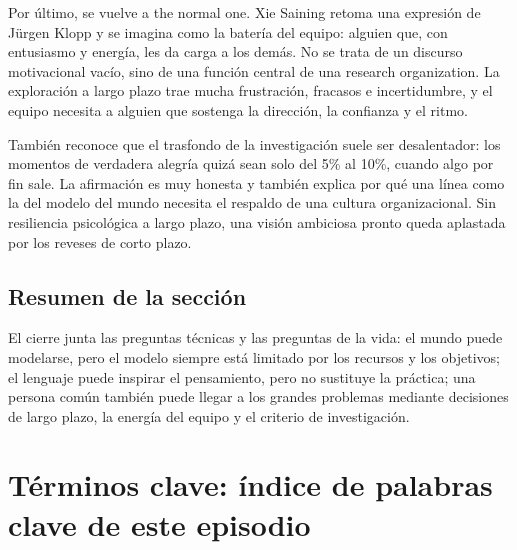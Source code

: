 \documentclass[a4paper]{article}
\begin{document}
Por último, se vuelve a the normal one. Xie Saining retoma una expresión de Jürgen Klopp y se imagina como la batería del equipo: alguien que, con entusiasmo y energía, les da carga a los demás. No se trata de un discurso motivacional vacío, sino de una función central de una research organization. La exploración a largo plazo trae mucha frustración, fracasos e incertidumbre, y el equipo necesita a alguien que sostenga la dirección, la confianza y el ritmo.

También reconoce que el trasfondo de la investigación suele ser desalentador: los momentos de verdadera alegría quizá sean solo del 5\% al 10\%, cuando algo por fin sale. La afirmación es muy honesta y también explica por qué una línea como la del modelo del mundo necesita el respaldo de una cultura organizacional. Sin resiliencia psicológica a largo plazo, una visión ambiciosa pronto queda aplastada por los reveses de corto plazo.

\subsection{Resumen de la sección}

El cierre junta las preguntas técnicas y las preguntas de la vida: el mundo puede modelarse, pero el modelo siempre está limitado por los recursos y los objetivos; el lenguaje puede inspirar el pensamiento, pero no sustituye la práctica; una persona común también puede llegar a los grandes problemas mediante decisiones de largo plazo, la energía del equipo y el criterio de investigación.
\section{Términos clave: índice de palabras clave de este episodio}
\end{document}
